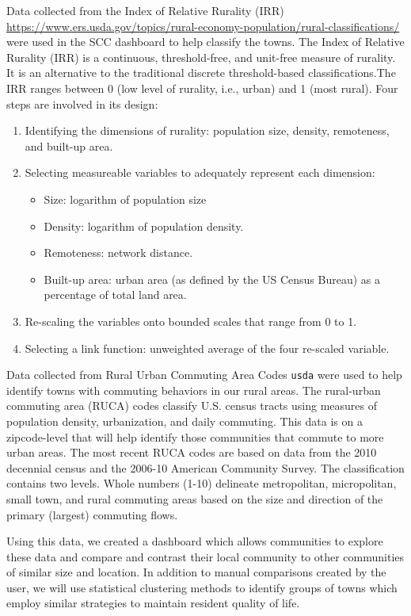 \documentclass[letterpaper,inpress]{jdsart}
\begin{document}
Data collected from the Index of Relative Rurality (IRR) \url{https://www.ers.usda.gov/topics/rural-economy-population/rural-classifications/} were used in the SCC dashboard to help classify the towns. The Index of Relative Rurality (IRR) is a continuous, threshold-free, and unit-free measure of rurality. It is an alternative to the traditional discrete threshold-based classifications.The IRR ranges between 0 (low level of rurality, i.e., urban) and 1 (most rural). Four steps are involved in its design:

\begin{enumerate}
\item Identifying the dimensions of rurality: population size, density, remoteness, and built-up area.
\item Selecting measureable variables to adequately represent each dimension:
    \begin{itemize}
        \item Size: logarithm of population size
        \item Density: logarithm of population density.
        \item Remoteness: network distance.
        \item Built-up area: urban area (as defined by the US Census Bureau) as a percentage of total land area.
    \end{itemize}
\item Re-scaling the variables onto bounded scales that range from 0 to 1.
\item Selecting a link function: unweighted average of the four re-scaled variable.
\end{enumerate}

Data collected from Rural Urban Commuting Area Codes \texttt{usda} were used to help identify towns with commuting behaviors in our rural areas. The rural-urban commuting area (RUCA) codes classify U.S. census tracts using measures of population density, urbanization, and daily commuting. This data is on a zipcode-level that will help identify those communities that commute to more urban areas. The most recent RUCA codes are based on data from the 2010 decennial census and the 2006-10 American Community Survey. The classification contains two levels. Whole numbers (1-10) delineate metropolitan, micropolitan, small town, and rural commuting areas based on the size and direction of the primary (largest) commuting flows.

Using this data, we created a dashboard which allows communities to explore these data and compare and contrast their local community to other communities of similar size and location. In addition to manual comparisons created by the user, we will use statistical clustering methods to identify groups of towns which employ similar strategies to maintain resident quality of life.
\end{document}
